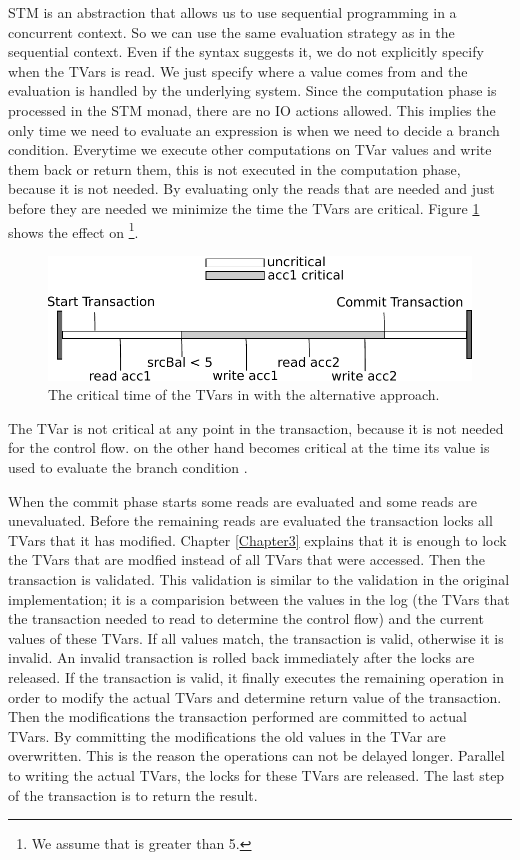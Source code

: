 STM is an abstraction that allows us to use sequential programming in a concurrent context. So we can use the 
same evaluation strategy as in the sequential context. Even if the syntax suggests it, we do not explicitly
specify when the TVars is read. We just specify where a value comes from and the evaluation is handled by the 
underlying system. Since the computation phase is processed in the STM monad, there are no IO actions allowed.  
This implies the only time we need to evaluate an expression is when we need to decide a branch condition. 
Everytime we execute other computations on TVar values and write them back or return them, this is not executed 
in the computation phase, because it is not needed. 
By evaluating only the reads that are needed and just before they are needed we minimize the time the TVars are critical. 
Figure \ref{fig:lessCriticalValue} shows the effect on \footnote{We 
assume that  is greater than 5.}. 
\begin{figure}
\centering
\includegraphics{Figures/lessCriticalValue}
\decoRule
\caption[lessCriticalValue]{The critical time of the TVars in  with the alternative approach.}
\label{fig:lessCriticalValue}
\end{figure}
The TVar  is not critical at any point in the transaction, because it is not needed for the control 
flow.  on the other hand becomes critical at the time its value is used to evaluate the branch
condition .

When the commit phase starts some reads are evaluated and some reads are unevaluated. Before the remaining
reads are evaluated the transaction locks all TVars that it has modified. Chapter \ref{Chapter3} explains that it 
is enough to lock the TVars that are modfied instead of all TVars that were accessed. Then the transaction is validated.
This validation is similar to the validation in the original implementation; it is a comparision between
the values in the log (the TVars that the transaction needed to read to determine the control flow) and
the current values of these TVars. If all values match, the transaction is valid, otherwise it is invalid.
An invalid transaction is rolled back immediately after the locks are released. If the transaction is
valid, it finally executes the remaining  operation in order to modify the 
actual TVars and determine return value of the transaction. Then the modifications the transaction 
performed are committed to actual TVars. By committing the modifications the old values in the TVar are 
overwritten. This is the reason the  operations can not 
be delayed longer. 
Parallel to writing the actual TVars, the locks for these TVars are released. The last step of the transaction 
is to return the result. 


